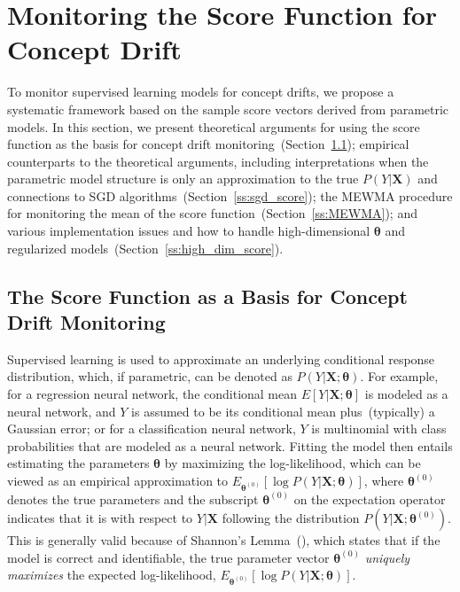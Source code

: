 \documentclass[twoside,11pt]{article}
\begin{document}
\section{Monitoring the Score Function for Concept Drift}
\label{s:theory_analysis_score}
To monitor supervised learning models for concept drifts, we propose a systematic framework based on the sample score vectors derived from parametric models. In this section, we present theoretical arguments for using the score function as the basis for concept drift monitoring~(Section~\ref{ss:score_func}); empirical counterparts to the theoretical arguments, including interpretations when the parametric model structure is only an approximation to the true $P(Y|\bm{X})$ and connections to SGD algorithms~(Section~\ref{ss:sgd_score}); the MEWMA procedure for monitoring the mean of the score function~(Section~\ref{ss:MEWMA}); and various implementation issues and how to handle high-dimensional $\bm{\theta}$ and regularized models~(Section~\ref{ss:high_dim_score}).

\subsection{The Score Function as a Basis for Concept Drift Monitoring}
\label{ss:score_func}
Supervised learning is used to approximate an underlying conditional response distribution, which, if parametric, can be denoted as $P(Y|\bm{X};\bm{\theta})$. For example, for a regression neural network, the conditional mean $E[Y|\bm{X};\bm{\theta}]$ is modeled as a neural network, and $Y$ is assumed to be its conditional mean plus~(typically) a Gaussian error; or for a classification neural network, $Y$ is multinomial with class probabilities that are modeled as a neural network. Fitting the model then entails estimating the parameters $\bm{\theta}$ by maximizing the log-likelihood, which can be viewed as an empirical approximation to $E_{\bm{\theta}^{(0)}}[\log{P(Y|\bm{X};\bm{\theta})}]$, where $\bm{\theta}^{(0)}$ denotes the true parameters and the subscript $\bm { \theta} ^{ (0)}$ on the expectation operator indicates that it is with respect to $Y|\bm{X}$ following the distribution $P(Y|\bm{X};\bm{\theta}^{(0)})$. This is generally valid because of Shannon's Lemma~(\cite{shannon1948mathematical}), which states that if the model is correct and identifiable, the true parameter vector $\bm{\theta}^{(0)}$ \textit{uniquely maximizes} the expected log-likelihood, $E_{\bm{\theta}^{(0)}}[\log{P(Y|\bm{X};\bm{\theta})}]$. 
\end{document}
